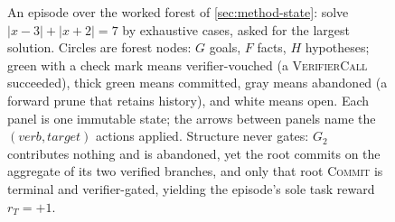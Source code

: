 \begin{figure}[t]
\caption{An episode over the worked forest of \cref{sec:method-state}: solve
$|x{-}3| + |x{+}2| = 7$ by exhaustive cases, asked for the largest solution.
Circles are forest nodes: $G$ goals, $F$ facts, $H$ hypotheses; green with a
check mark means verifier-vouched (a \textsc{VerifierCall} succeeded), thick
green means committed, gray means abandoned (a forward prune that retains
history), and white means open. Each panel is one immutable state; the
arrows between panels name the $(\textit{verb}, \textit{target})$ actions
applied. Structure never gates: $G_2$ contributes nothing and is abandoned,
yet the root commits on the aggregate of its two verified branches, and only
that root \textsc{Commit} is terminal and verifier-gated, yielding the
episode's sole task reward $r_T = +1$.}
\label{fig:episode-timeline}
\end{figure}
